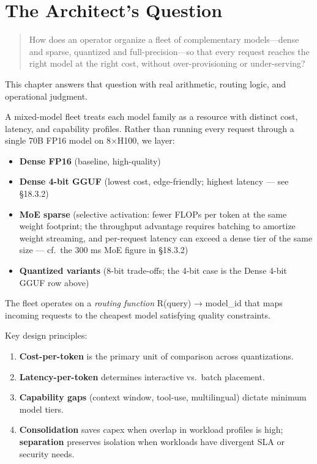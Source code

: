 \section*{The Architect's Question}\label{the-architects-question}

\begin{quote}
How does an operator organize a fleet of complementary models---dense
and sparse, quantized and full-precision---so that every request reaches
the right model at the right cost, without over-provisioning or
under-serving?
\end{quote}

This chapter answers that question with real arithmetic, routing logic,
and operational judgment.

\label{concept}


A mixed-model fleet treats each model family as a resource with distinct
cost, latency, and capability profiles. Rather than running every
request through a single 70B FP16 model on 8×H100, we layer:

\begin{itemize}
\tightlist
\item
  \textbf{Dense FP16} (baseline, high-quality)
\item
  \textbf{Dense 4-bit GGUF} (lowest cost, edge-friendly; highest latency
  --- see §18.3.2)
\item
  \textbf{MoE sparse} (selective activation: fewer FLOPs per token at
  the same weight footprint; the throughput advantage requires batching
  to amortize weight streaming, and per-request latency can exceed a
  dense tier of the same size --- cf.~the 300 ms MoE figure in §18.3.2)
\item
  \textbf{Quantized variants} (8-bit trade-offs; the 4-bit case is the
  Dense 4-bit GGUF row above)
\end{itemize}

The fleet operates on a \emph{routing function} R(query) → model\_id
that maps incoming requests to the cheapest model satisfying quality
constraints.

Key design principles:

\begin{enumerate}
\def\labelenumi{\arabic{enumi}.}
\tightlist
\item
  \textbf{Cost-per-token} is the primary unit of comparison across
  quantizations.
\item
  \textbf{Latency-per-token} determines interactive vs.~batch placement.
\item
  \textbf{Capability gaps} (context window, tool-use, multilingual)
  dictate minimum model tiers.
\item
  \textbf{Consolidation} saves capex when overlap in workload profiles
  is high; \textbf{separation} preserves isolation when workloads have
  divergent SLA or security needs.
\end{enumerate}


